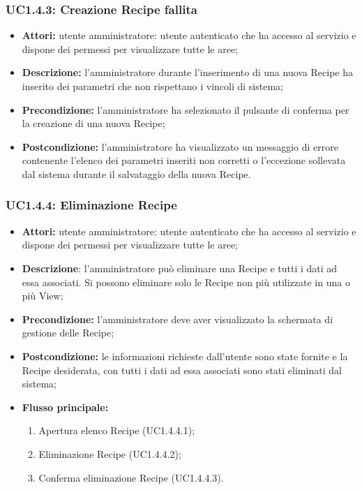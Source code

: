 \subsubsection{UC1.4.3: Creazione Recipe fallita}

\begin{itemize}
  	\item \textbf{Attori:} utente amministratore: utente autenticato che ha accesso al servizio e dispone dei permessi per visualizzare tutte le aree;
    \item \textbf{Descrizione:} l'amministratore durante l'inserimento di una nuova Recipe ha inserito dei parametri che non rispettano i vincoli di sistema;
    \item \textbf{Precondizione:} l'amministratore ha selezionato il pulsante di conferma per la creazione di una nuova Recipe;
    \item \textbf{Postcondizione:} l'amministratore ha visualizzato un messaggio di errore contenente l'elenco dei parametri inseriti non corretti o l'eccezione sollevata dal sistema durante il salvataggio della nuova Recipe.
\end{itemize}

\subsubsection{UC1.4.4: Eliminazione Recipe}

\begin{itemize}
  	\item \textbf{Attori:} utente amministratore: utente autenticato che ha accesso al servizio e dispone dei permessi per visualizzare tutte le aree;
    \item \textbf{Descrizione}: l'amministratore può eliminare una Recipe e tutti i dati ad essa associati.
    Si possono eliminare solo le Recipe non più utilizzate in una o più View;
    \item \textbf{Precondizione:} l'amministratore deve aver visualizzato la schermata di gestione delle Recipe;
    \item \textbf{Postcondizione:} le informazioni richieste dall'utente sono state fornite e la Recipe desiderata, con tutti i dati ad essa associati sono stati eliminati dal sistema;
    \item \textbf{Flusso principale:}

    \begin{enumerate}
        \item Apertura elenco Recipe (UC1.4.4.1);
        \item Eliminazione Recipe (UC1.4.4.2);
        \item Conferma eliminazione Recipe (UC1.4.4.3).
    \end{enumerate}

\end{itemize}

